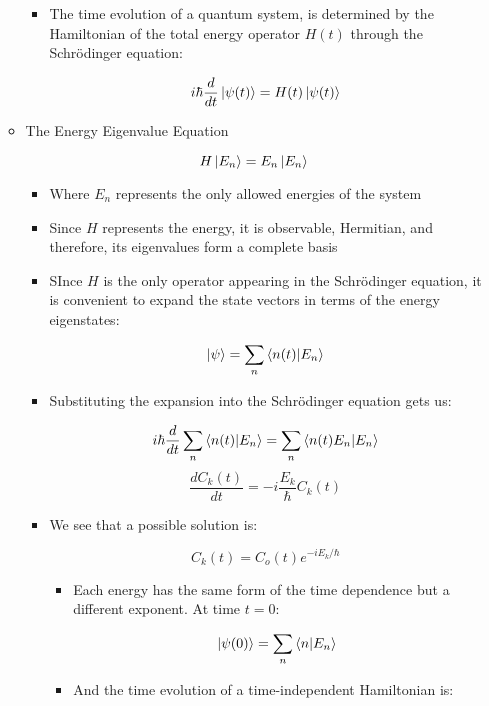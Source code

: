 \begin{itemize}
\begin{itemize}
\begin{itemize}
          \item The time evolution of a quantum system, is determined by the Hamiltonian of the total energy operator $H(t)$ through the Schr\"odinger equation:

            $$i\hbar\frac{d}{dt}\ket{\psi(t)}=H(t)\ket{\psi(t)}$$

        \end{itemize}

      \item The Energy Eigenvalue Equation

        $$H\ket{E_n}=E_n\ket{E_n}$$

        \begin{itemize}

          \item Where $E_n$ represents the only allowed energies of the system

          \item Since $H$ represents the energy, it is observable, Hermitian, and therefore, its eigenvalues form a complete basis

          \item SInce $H$ is the only operator appearing in the Schr\"odinger equation, it is convenient to expand the state vectors in terms of the energy eigenstates:

            $$\ket{\psi}=\sum_{n}\bra{n(t)}\ket{E_n}$$

          \item Substituting the expansion into the Schr\"odinger equation gets us:

            $$i\hbar\frac{d}{dt}\sum_n \bra{n(t)}\ket{E_n}=\sum_n\bra{n(t)E_n}\ket{E_n}$$
            $$\frac{d C_k(t)}{dt}=- i\frac{E_k}{\hbar}C_k(t)$$

          \item We see that a possible solution is:

            $$C_k(t)=C_o(t)e^{-iE_k/\hbar}$$

            \begin{itemize}

              \item Each energy has the same form of the time dependence but a different exponent. At time $t=0$:

                $$\ket{\psi(0)}=\sum_n\bra{n}\ket{E_n}$$

              \item And the time evolution of a time-independent Hamiltonian is:


\end{itemize}
\end{itemize}
\end{itemize}
\end{itemize}
